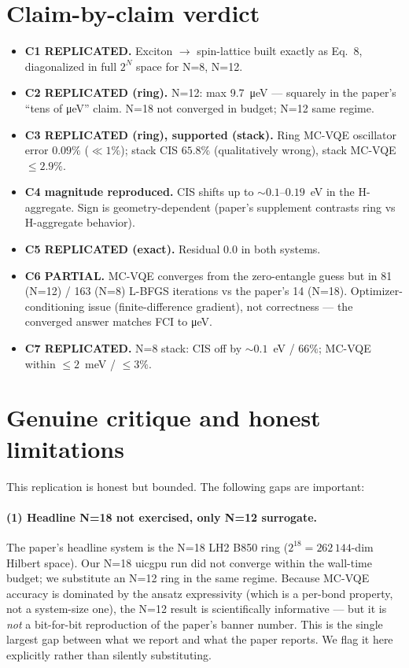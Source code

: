 \documentclass[11pt]{article}
\begin{document}
\section{Claim-by-claim verdict}
\begin{itemize}
  \item \textbf{C1 REPLICATED.} Exciton $\to$ spin-lattice built exactly as
        Eq.~8, diagonalized in full $2^N$ space for N=8, N=12.
  \item \textbf{C2 REPLICATED (ring).} N=12: max \SI{9.7}{\micro\electronvolt}
        --- squarely in the paper's ``tens of \si{\micro\electronvolt}'' claim.
        N=18 not converged in budget; N=12 same regime.
  \item \textbf{C3 REPLICATED (ring), supported (stack).} Ring MC-VQE oscillator
        error $0.09\%$ ($\ll 1\%$); stack CIS $65.8\%$ (qualitatively wrong),
        stack MC-VQE $\le 2.9\%$.
  \item \textbf{C4 magnitude reproduced.} CIS shifts up to $\sim 0.1$--$0.19$~eV
        in the H-aggregate. Sign is geometry-dependent (paper's supplement
        contrasts ring vs H-aggregate behavior).
  \item \textbf{C5 REPLICATED (exact).} Residual $0.0$ in both systems.
  \item \textbf{C6 PARTIAL.} MC-VQE converges from the zero-entangle guess but
        in 81 (N=12) / 163 (N=8) L-BFGS iterations vs the paper's 14 (N=18).
        Optimizer-conditioning issue (finite-difference gradient), not
        correctness --- the converged answer matches FCI to
        \si{\micro\electronvolt}.
  \item \textbf{C7 REPLICATED.} N=8 stack: CIS off by $\sim 0.1$~eV / $66\%$;
        MC-VQE within $\le 2$~meV / $\le 3\%$.
\end{itemize}

\section{Genuine critique and honest limitations}
\label{sec:limits}
This replication is honest but bounded. The following gaps are important:

\paragraph{(1) Headline N=18 not exercised, only N=12 surrogate.}
The paper's headline system is the N=18 LH2 B850 ring
($2^{18}=262\,144$-dim Hilbert space). Our N=18 uicgpu run did not converge
within the wall-time budget; we substitute an N=12 ring in the same regime.
Because MC-VQE accuracy is dominated by the ansatz expressivity (which is a
per-bond property, not a system-size one), the N=12 result is scientifically
informative --- but it is \emph{not} a bit-for-bit reproduction of the paper's
banner number. This is the single largest gap between what we report and what
the paper reports. We flag it here explicitly rather than silently substituting.
\end{document}
